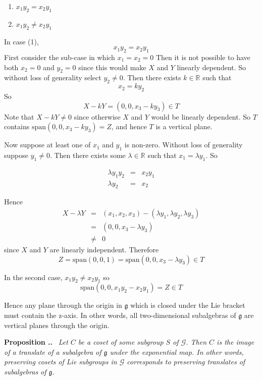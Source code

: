 \documentclass[honours]{UNSWthesis}
\newcommand{\R}{\mathbb{R}}
\newcommand{\G}{\mathcal{G}}
\newcommand{\g}{\mathfrak{g}}
\newcommand{\1}{\mathbf{e}_{1}}
\newcommand{\2}{\mathbf{e}_{3}}
\newcommand{\3}{\mathbf{e}_{3}}
\newcounter{Item}[section]
\newenvironment{Proposition}{\medskip
                            \refstepcounter{Item}
                            \noindent
                           {\bf Proposition \thesection.\theItem.}\ %
                            \begingroup \sl}
                           {\endgroup\medskip}
\begin{document}
\begin{enumerate}
 \item $x_{1}y_{2}=x_{2}y_{1}$
 \item $x_{1}y_{2}\neq x_{2}y_{1}$
\end{enumerate}

In case (1), 
\[
x_{1}y_{2}=x_{2}y_{1}
\]
First consider the sub-case in which $x_{1}=x_{2}=0$ Then it is not possible to have both $x_{2}=0$ and $y_{2}=0$ since this would make $X$ and $Y$ linearly dependent. So without loss of generality select $y_{2} \neq 0$. Then there exists $k \in \R$ such that 
\[
x_{2} = ky_{2}
\]
So 
\[
X-kY=(0,0,x_{3}-ky_{3}) \in T
\]
Note that $X-kY \neq 0$ since otherwise $X$ and $Y$ would be linearly dependent. So $T$ contains $\text{span}(0,0,x_{3}-ky_{3})=Z$, and hence $T$ is a vertical plane. 

Now suppose at least one of $x_{1}$ and $y_{1}$ is non-zero. Without loss of generality suppose $y_{1} \neq 0$.
Then there exists some $\lambda \in \R$ such that $x_{1} = \lambda y_{1}$. So

\begin{eqnarray*}
 \lambda y_{1}y_{2} &=& x_{2} y_{1}\\
 \lambda y_{2} &=& x_{2}
\end{eqnarray*}

Hence
\begin{eqnarray*}
 X-\lambda Y & = & (x_{1},x_{2},x_{3})-(\lambda y_{1},\lambda y_{2},\lambda y_{3}) \\
	     & = & (0,0,x_{3}-\lambda y_{3}) \\
	     & \neq & 0
\end{eqnarray*}
since $X$ and $Y$ are linearly independent. 
Therefore 
\[
Z=\text{span}(0,0,1)=\text{span}(0,0,x_{3}-\lambda y_{3}) \in T
\]

In the second case, $x_{1}y_{2}\neq x_{2}y_{1}$ so 
\[
\text{span}(0,0, x_{1}y_{2}- x_{2}y_{1})= Z \in T
\]

Hence any plane through the origin in $\g$ which is closed under the Lie bracket must contain the z-axis. In other words, all two-dimensional subalgebras of $\g$ are vertical planes through the origin.


\begin{Proposition}
Let $C$ be a coset of some subgroup $S$ of $\G$. Then $C$ is the image of a translate of a subalgebra of $\g$ under the exponential map. In other words, preserving cosets of Lie subgroups in $\G$ corresponds to preserving translates of subalgebras of $\g$.
\end{Proposition}
\end{document}

